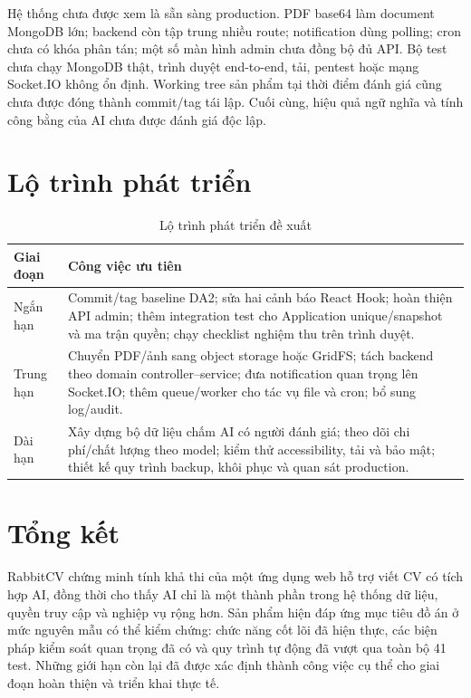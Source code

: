 Hệ thống chưa được xem là sẵn sàng production. PDF base64 làm document MongoDB lớn; backend còn tập trung nhiều route; notification dùng polling; cron chưa có khóa phân tán; một số màn hình admin chưa đồng bộ đủ API. Bộ test chưa chạy MongoDB thật, trình duyệt end-to-end, tải, pentest hoặc mạng Socket.IO không ổn định. Working tree sản phẩm tại thời điểm đánh giá cũng chưa được đóng thành commit/tag tái lập. Cuối cùng, hiệu quả ngữ nghĩa và tính công bằng của AI chưa được đánh giá độc lập.

\section{Lộ trình phát triển}

\begin{table}[H]
    \centering
    \small
    \begin{tabularx}{\textwidth}{|p{}|Y|} \hline
        \textbf{Giai đoạn} & \textbf{Công việc ưu tiên} \\ \hline
        Ngắn hạn & Commit/tag baseline DA2; sửa hai cảnh báo React Hook; hoàn thiện API admin; thêm integration test cho Application unique/snapshot và ma trận quyền; chạy checklist nghiệm thu trên trình duyệt. \\ \hline
        Trung hạn & Chuyển PDF/ảnh sang object storage hoặc GridFS; tách backend theo domain controller--service; đưa notification quan trọng lên Socket.IO; thêm queue/worker cho tác vụ file và cron; bổ sung log/audit. \\ \hline
        Dài hạn & Xây dựng bộ dữ liệu chấm AI có người đánh giá; theo dõi chi phí/chất lượng theo model; kiểm thử accessibility, tải và bảo mật; thiết kế quy trình backup, khôi phục và quan sát production. \\ \hline
    \end{tabularx}
    \caption{Lộ trình phát triển đề xuất}
    \label{tab:roadmap}
\end{table}

\section{Tổng kết}

RabbitCV chứng minh tính khả thi của một ứng dụng web hỗ trợ viết CV có tích hợp AI, đồng thời cho thấy AI chỉ là một thành phần trong hệ thống dữ liệu, quyền truy cập và nghiệp vụ rộng hơn. Sản phẩm hiện đáp ứng mục tiêu đồ án ở mức nguyên mẫu có thể kiểm chứng: chức năng cốt lõi đã hiện thực, các biện pháp kiểm soát quan trọng đã có và quy trình tự động đã vượt qua toàn bộ 41 test. Những giới hạn còn lại đã được xác định thành công việc cụ thể cho giai đoạn hoàn thiện và triển khai thực tế.
